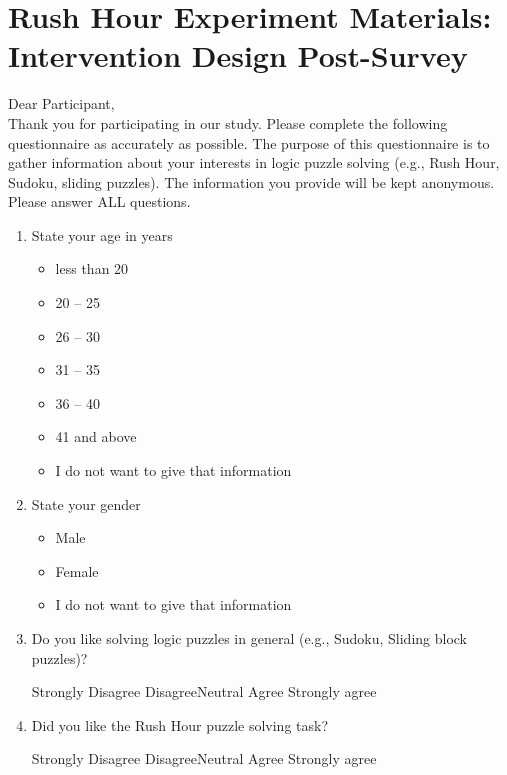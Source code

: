 \documentclass[doctor]{thesis} %
\theoremstyle{plain}
\begin{document}
\chapter{Rush Hour Experiment Materials: Intervention Design Post-Survey}
\label{apx:rushpre}
Dear Participant,\\
Thank you for participating in our study. Please complete the following questionnaire as accurately as possible. The purpose of this questionnaire is to gather information about your interests in logic puzzle solving (e.g., Rush Hour, Sudoku, sliding puzzles). The information you provide will be kept anonymous. \\
Please answer ALL questions.

\begin{enumerate}[topsep=-4em]
\item State your age in years
\begin{itemize}[topsep=-6em, label={o}]
\itemsep-1em 
\item less than 20
\item 20 -- 25
\item 26 -- 30
\item 31 -- 35
\item 36 -- 40
\item 41 and above
\item I do not want to give that information
\end{itemize}
\item State your gender
\begin{itemize}[topsep=-6em, label={o}]
\itemsep-1em 
\item Male
\item Female
\item I do not want to give that information
\end{itemize}
\item Do you like solving logic puzzles in general (e.g., Sudoku, Sliding block puzzles)?
\par Strongly Disagree \hspace{1cm} Disagree\hspace{1cm}Neutral\hspace{1cm} Agree\hspace{1cm} Strongly agree
\item Did you like the Rush Hour puzzle solving task?
\par Strongly Disagree \hspace{1cm} Disagree\hspace{1cm}Neutral\hspace{1cm} Agree\hspace{1cm} Strongly agree

\end{enumerate}
\end{document}

